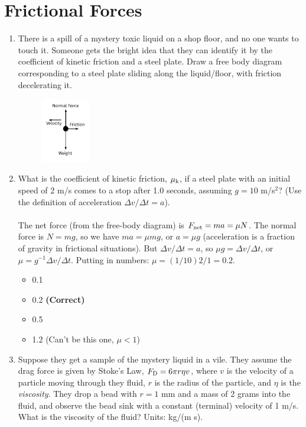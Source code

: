 \documentclass[10pt]{article}
\begin{document}
\section{Frictional Forces}
\begin{enumerate}
\item There is a spill of a mystery toxic liquid on a shop floor, and no one wants to touch it.  Someone gets the bright idea that they can identify it by the coefficient of kinetic friction and a steel plate.  Draw a free body diagram corresponding to a steel plate sliding along the liquid/floor, with friction decelerating it. \\
\begin{figure}[ht]
\centering
\includegraphics[width=0.2\textwidth]{figures/FBD3.pdf}
\end{figure}
\item What is the coefficient of kinetic friction, $\mu_{\rm k}$, if a steel plate with an initial speed of 2 m/s comes to a stop after 1.0 seconds, assuming $g = 10$ m/s$^2$?  (Use the definition of acceleration $\Delta v/\Delta t = a$). \\ \\
The net force (from the free-body diagram) is $F_{\rm net} = ma = \mu N$.  The normal force is $N = mg$, so we have $ma = \mu m g$, or $a = \mu g$ (acceleration is a fraction of gravity in frictional situations).  But $\Delta v/\Delta t = a$, so $\mu g = \Delta v/\Delta t$, or $\mu = g^{-1} \Delta v/\Delta t$.  Putting in numbers: $\mu = (1/10) 2/1 = 0.2$.
\begin{itemize}
\item 0.1
\item 0.2 \textbf{(Correct)}
\item 0.5
\item 1.2 (Can't be this one, $\mu < 1$)
\end{itemize}
\item Suppose they get a sample of the mystery liquid in a vile.  They assume the drag force is given by Stoke's Law, $F_{\rm D} = 6\pi r \eta v$, where $v$ is the velocity of a particle moving through they fluid, $r$ is the radius of the particle, and $\eta$ is the \textit{viscosity}.  They drop a bead with $r = 1$ mm and a mass of 2 grams into the fluid, and observe the bead sink with a constant (terminal) velocity of 1 m/s.  What is the viscosity of the fluid?  Units: kg/(m s). \\ \\

\end{enumerate}
\end{document}
